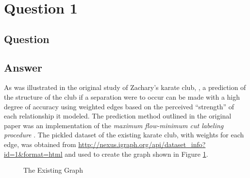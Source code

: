 \section{Question 1}

\subsection{Question}


\subsection{Answer}
As was illustrated in the original study of Zachary's karate club, \cite{wzach77}, a prediction of the structure of the club if a separation were to occur can be made with a high degree of accuracy using weighted edges based on the perceived ``strength'' of each relationship it modeled. The prediction method outlined in the original paper was an implementation of the \textit{maximum flow-minimum cut labeling procedure} \cite{forful62}. The pickled \cite{py:pickle} dataset of the existing karate club, with weights for each edge, was obtained from \url{http://nexus.igraph.org/api/dataset_info?id=1&format=html} and used to create the graph shown in Figure \ref{fig:existing_graph}.

\begin{figure}[h!]
\centering
{}
\caption{The Existing Graph}
\label{fig:existing_graph}
\end{figure}

